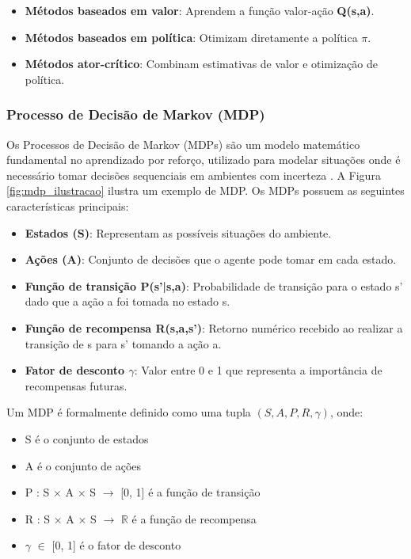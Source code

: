 \begin{itemize}
\item \textbf{Métodos baseados em valor}: Aprendem a função valor-ação \textbf{Q(s,a)}.
\item \textbf{Métodos baseados em política}: Otimizam diretamente a política \textbf{$\pi$}.
\item \textbf{Métodos ator-crítico}: Combinam estimativas de valor e otimização de política.
\end{itemize}

\subsubsection{Processo de Decisão de Markov (MDP)}
\label{subsubsec:mdp}

Os Processos de Decisão de Markov (MDPs) são um modelo matemático fundamental no aprendizado por reforço, utilizado para modelar situações onde é necessário tomar decisões sequenciais em ambientes com incerteza \cite{introducao_modelos_probabilisticos}. A Figura \ref{fig:mdp_ilustracao} ilustra um exemplo de MDP. Os MDPs possuem as seguintes características principais:

\begin{itemize}
\item \textbf{Estados (S)}: Representam as possíveis situações do ambiente.
\item \textbf{Ações (A)}: Conjunto de decisões que o agente pode tomar em cada estado.
\item \textbf{Função de transição P(s'|s,a)}: Probabilidade de transição para o estado s' dado que a ação a foi tomada no estado s.
\item \textbf{Função de recompensa R(s,a,s')}: Retorno numérico recebido ao realizar a transição de s para s' tomando a ação a.
\item \textbf{Fator de desconto $\gamma$}: Valor entre 0 e 1 que representa a importância de recompensas futuras.
\end{itemize}

Um MDP é formalmente definido como uma tupla $(S, A, P, R, \gamma)$, onde:

\begin{itemize}
\item S é o conjunto de estados
\item A é o conjunto de ações
\item P : S $\times$ A $\times$ S $\rightarrow$ [0, 1] é a função de transição
\item R : S $\times$ A $\times$ S $\rightarrow$ \(\mathbb{R}\) é a função de recompensa
\item \(\gamma\) \(\in\) [0, 1] é o fator de desconto
\end{itemize}

